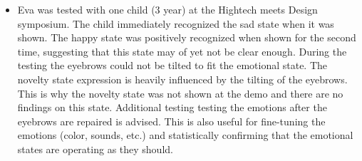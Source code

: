 \documentclass[project_eva.tex]{subfiles}
\begin{document}
\begin{itemize}
\item Eva was tested with one child (3 year) at the Hightech meets Design symposium. The child immediately recognized the sad state when it was shown. The happy state was positively recognized when shown for the second time, suggesting that this state may of yet not be clear enough.  During the testing the eyebrows could not be tilted to fit the emotional state. The novelty state expression is heavily influenced by the tilting of the eyebrows. This is why the novelty state was not shown at the demo and there are no findings on this state. Additional testing testing the emotions after the eyebrows are repaired is advised. This is also useful for fine-tuning the emotions (color, sounds, etc.) and statistically confirming that the emotional states are operating as they should.
\end{itemize}
\end{document}
